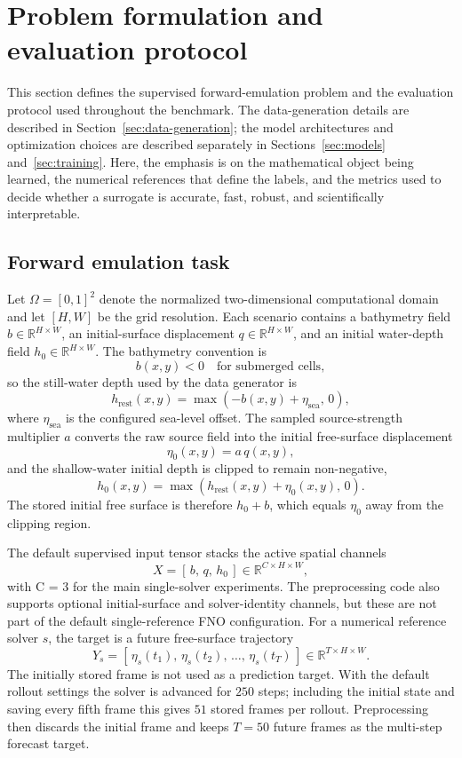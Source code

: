 \section{Problem formulation and evaluation protocol}
\label{sec:methods}

This section defines the supervised forward-emulation problem and the evaluation protocol used throughout the benchmark. The data-generation details are described in Section~\ref{sec:data-generation}; the model architectures and optimization choices are described separately in Sections~\ref{sec:models} and~\ref{sec:training}. Here, the emphasis is on the mathematical object being learned, the numerical references that define the labels, and the metrics used to decide whether a surrogate is accurate, fast, robust, and scientifically interpretable.

\subsection{Forward emulation task}
\label{subsec:forward-task}
Let $\Omega=[0, 1]^2$ denote the normalized two-dimensional computational domain and let $[H, W]$ be the grid resolution. Each scenario contains a bathymetry field $b\in\mathbb{R}^{H \times W}$, an initial-surface displacement $q \in\mathbb{R}^{H \times W}$, and an initial water-depth field $h_0 \in\mathbb{R}^{H \times W}$. The bathymetry convention is
\[
b(x, y) < 0 \quad \text {for submerged cells},
\]
so the still-water depth used by the data generator is
\[
h_{\mathrm{rest}}(x, y) = \max(-b(x, y) + \eta_{\mathrm{sea}},\, 0),
\]
where $\eta_{\mathrm{sea}}$ is the configured sea-level offset. The sampled source-strength multiplier $a$ converts the raw source field into the initial free-surface displacement
\[
\eta_0(x, y) = a\, q(x, y),
\]
and the shallow-water initial depth is clipped to remain non-negative,
\[
h_0(x, y) = \max(h_{\mathrm{rest}}(x, y) + \eta_0(x, y),\, 0).
\]
The stored initial free surface is therefore $h_0 + b$, which equals $\eta_0$ away from the clipping region.

The default supervised input tensor stacks the active spatial channels
\[
X = [\,b,\, q,\, h_0\,] \in\mathbb{R}^{C \times H \times W},    %
\]
with C = 3 for the main single-solver experiments. The preprocessing code also supports optional initial-surface and solver-identity channels, but these are not part of the default single-reference FNO configuration. For a numerical reference solver $s$, the target is a future free-surface trajectory
\[
Y_s = [\,\eta_s(t_1),\, \eta_s(t_2),\, \ldots,\, \eta_s(t_T)\,] \in\mathbb{R}^{T \times H \times W}.
\]
The initially stored frame is not used as a prediction target. With the default rollout settings the solver is advanced for $250$ steps; including the initial state and saving every fifth frame this gives $51$ stored frames per rollout. Preprocessing then discards the initial frame and keeps $T=50$ future frames as the multi-step forecast target.

